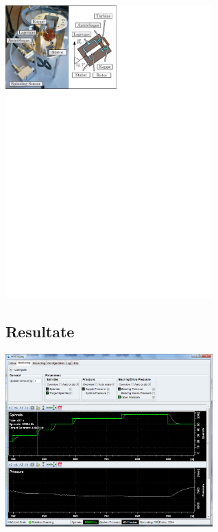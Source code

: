 \documentclass[a4paper]{article}
\newenvironment{Figure}
	{\par\medskip\noindent\minipage{\linewidth}}
	{\endminipage\par\medskip}
\begin{document}
\begin{multicols*}{2}
				
				\begin{Figure}
					\centering
					\includegraphics[trim={0cm 21.2cm 9.7cm 0},clip,width=8cm]{images/Device_3.pdf}
					\label{fig:xray}
					\vspace*{4mm}
				\end{Figure}
				
			\subsection{Resultate}
				
				\begin{Figure}
					\centering
					\includegraphics[width=8cm]{images/gruppe1_auf.png}
					\label{fig:xray}
					\vspace*{4mm}
				\end{Figure}
				

\end{multicols*}
\end{document}
